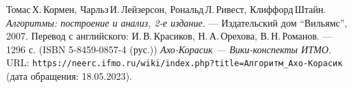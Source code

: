 \begin{thebibliography}{99}
Томас\,Х.\,Кормен, Чарльз\,И.\,Лейзерсон, Рональд\,Л.\,Ривест, Клиффорд\,Штайн.
{\itshape Алгоритмы: построение и анализ, 2-е издание.} --- Издательский дом \enquote{Вильямс}, 2007. Перевод с английского: И.\,В.\,Красиков, Н.\,А.\,Орехова, В.\,Н.\,Романов. --- 1296 с. (ISBN 5-8459-0857-4 (рус.))
{\itshape Ахо-Корасик — Вики-конспекты ИТМО.} \\URL: \texttt{https://neerc.ifmo.ru/wiki/index.php?title=Алгоритм\_Ахо-Корасик} (дата обращения: 18.05.2023).
\end{thebibliography}
\pagebreak
